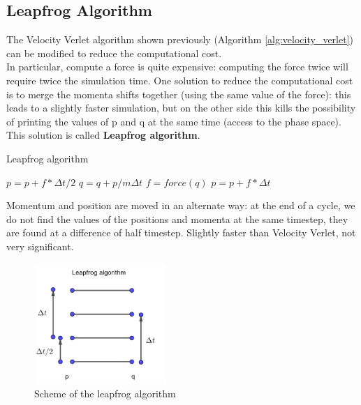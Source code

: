 \subsection{Leapfrog Algorithm}
The Velocity Verlet algorithm shown previously (Algorithm \ref{alg:velocity_verlet}) can be modified to reduce the computational cost.\\ In particular, compute a force is quite expensive: computing the force twice will require twice the simulation time. One solution to reduce the computational cost is to merge the momenta shifts together (using the same value of the force): this leads to a slightly faster simulation, but on the other side this kills the possibility of printing the values of p and q at the same time (access to the phase space). This solution is called \textbf{Leapfrog algorithm}.\\
\begin{algorithm}[H]
			\caption{Leapfrog algorithm}
			\label{alg:leapfrog}
			\begin{algorithmic}[1]
			    \State $p=p+f*\Delta t/2$	
    			\State	$q=q+p/m \Delta t$
                 \State	$f=force(q)$
    			\State	$p=p+f*\Delta t$
				\EndFor
			\end{algorithmic}
		\end{algorithm}
Momentum and position are moved in an alternate way: at the end of a cycle, we do not find the values of the positions and momenta at the same timestep, they are found at a difference of half timestep. Slightly faster than Velocity Verlet, not very significant. 
\begin{figure}[H]
    \centering
    \includegraphics[width=50mm,scale=0.5]{Integrators/images/leapfrog.png}
    \caption{Scheme of the leapfrog algorithm}
    \label{fig:leapfrog}
\end{figure}
